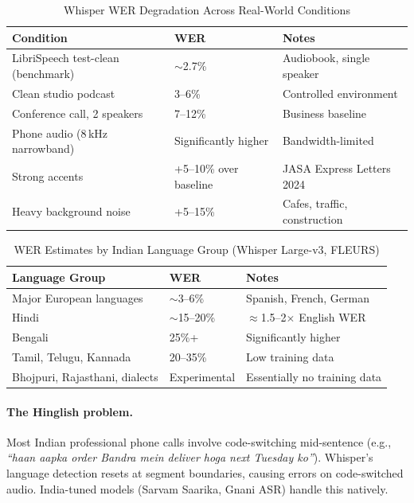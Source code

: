 \documentclass[12pt,a4paper]{article}
\begin{document}
\begin{table}[H]\centering
\caption{Whisper WER Degradation Across Real-World Conditions}
\label{tab:wer-conditions}
\begin{tabularx}{\textwidth}{llX}
\toprule
\textbf{Condition} & \textbf{WER} & \textbf{Notes} \\
\midrule
LibriSpeech test-clean (benchmark) & $\sim$2.7\%        & Audiobook, single speaker \\
Clean studio podcast               & 3--6\%             & Controlled environment \\
Conference call, 2 speakers        & 7--12\%            & Business baseline \\
Phone audio (8\,kHz narrowband)    & Significantly higher & Bandwidth-limited \\
Strong accents                     & +5--10\% over baseline & JASA Express Letters 2024 \\
Heavy background noise             & +5--15\%           & Cafes, traffic, construction \\
\bottomrule
\end{tabularx}
\end{table}

\begin{table}[H]\centering
\caption{WER Estimates by Indian Language Group (Whisper Large-v3, FLEURS)}
\label{tab:indian-wer}
\begin{tabularx}{\textwidth}{llX}
\toprule
\textbf{Language Group} & \textbf{WER} & \textbf{Notes} \\
\midrule
Major European languages         & $\sim$3--6\%   & Spanish, French, German \\
Hindi                            & $\sim$15--20\% & $\approx$1.5--2$\times$ English WER \\
Bengali                          & 25\%+          & Significantly higher \\
Tamil, Telugu, Kannada           & 20--35\%       & Low training data \\
Bhojpuri, Rajasthani, dialects   & Experimental   & Essentially no training data \\
\bottomrule
\end{tabularx}
\end{table}

\paragraph{The Hinglish problem.}
Most Indian professional phone calls involve code-switching mid-sentence
(e.g., \textit{``haan aapka order Bandra mein deliver hoga next Tuesday
ko''}).  Whisper's language detection resets at segment boundaries, causing
errors on code-switched audio.  India-tuned models (Sarvam Saarika, Gnani
ASR) handle this natively.
\end{document}
